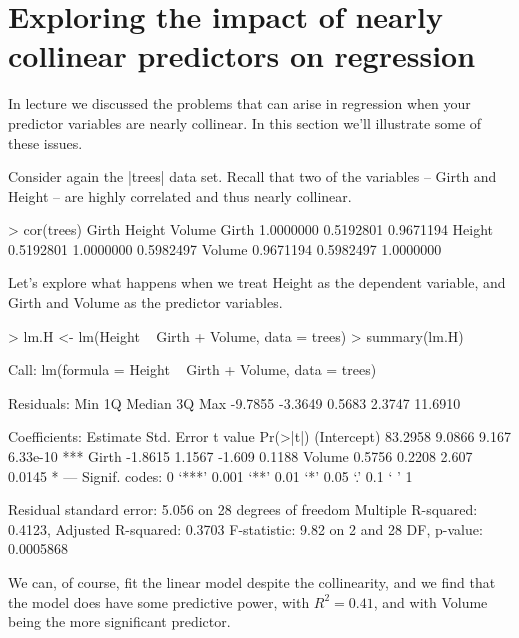 \section{Exploring the impact of nearly collinear predictors on regression}

In lecture we discussed the problems that can arise in regression when your predictor variables are nearly collinear. In this section we'll illustrate some of these issues.

Consider again the |trees| data set.  Recall that two of the variables -- Girth and Height -- are highly correlated and thus nearly collinear.
%
\begin{R}
> cor(trees)
           Girth    Height    Volume
Girth  1.0000000 0.5192801 0.9671194
Height 0.5192801 1.0000000 0.5982497
Volume 0.9671194 0.5982497 1.0000000
\end{R}
%
Let's explore what happens when we treat Height as the dependent variable, and Girth and Volume as the predictor variables.
%
\begin{R}
> lm.H <- lm(Height ~ Girth + Volume, data = trees)
> summary(lm.H)

Call:
lm(formula = Height ~ Girth + Volume, data = trees)

Residuals:
    Min      1Q  Median      3Q     Max 
-9.7855 -3.3649  0.5683  2.3747 11.6910 

Coefficients:
            Estimate Std. Error t value Pr(>|t|)    
(Intercept)  83.2958     9.0866   9.167 6.33e-10 ***
Girth        -1.8615     1.1567  -1.609   0.1188    
Volume        0.5756     0.2208   2.607   0.0145 *  
---
Signif. codes:  0 ‘***’ 0.001 ‘**’ 0.01 ‘*’ 0.05 ‘.’ 0.1 ‘ ’ 1

Residual standard error: 5.056 on 28 degrees of freedom
Multiple R-squared:  0.4123,    Adjusted R-squared:  0.3703 
F-statistic:  9.82 on 2 and 28 DF,  p-value: 0.0005868
\end{R}
%
We can, of course, fit the linear model despite the collinearity, and we find that the model does have some predictive power, with $R^2 = 0.41$, and with Volume being the more significant predictor.

